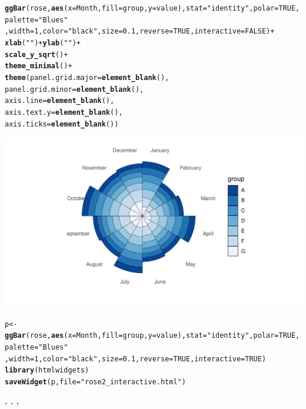 \documentclass{article}\usepackage[]{graphicx}\usepackage[]{color}
\makeatletter
\def\maxwidth{ %
  \ifdim\Gin@nat@width>\linewidth
    \linewidth
  \else
    \Gin@nat@width
  \fi
}
\newcommand{\hlnum}[1]{\textcolor[rgb]{0.686,0.059,0.569}{#1}}%
\newcommand{\hlstr}[1]{\textcolor[rgb]{0.192,0.494,0.8}{#1}}%
\newcommand{\hlopt}[1]{\textcolor[rgb]{0,0,0}{#1}}%
\newcommand{\hlstd}[1]{\textcolor[rgb]{0.345,0.345,0.345}{#1}}%
\newcommand{\hlkwb}[1]{\textcolor[rgb]{0.69,0.353,0.396}{#1}}%
\newcommand{\hlkwc}[1]{\textcolor[rgb]{0.333,0.667,0.333}{#1}}%
\newcommand{\hlkwd}[1]{\textcolor[rgb]{0.737,0.353,0.396}{\textbf{#1}}}%
\newenvironment{kframe}{%
 \def\at@end@of@kframe{}%
 \ifinner\ifhmode%
  \def\at@end@of@kframe{\end{minipage}}%
  \begin{minipage}{\columnwidth}%
 \fi\fi%
 \def\FrameCommand##1{\hskip\@totalleftmargin \hskip-\fboxsep
 \colorbox{shadecolor}{##1}\hskip-\fboxsep
     \hskip-\linewidth \hskip-\@totalleftmargin \hskip\columnwidth}%
 \MakeFramed {\advance\hsize-\width
   \@totalleftmargin\z@ \linewidth\hsize
   \@setminipage}}%
 {\par\unskip\endMakeFramed%
 \at@end@of@kframe}
\newenvironment{knitrout}{}{} %
\makeatother
\begin{document}
\begin{knitrout}
\color{fgcolor}\begin{kframe}
\begin{alltt}
\hlkwd{ggBar}\hlstd{(rose,}\hlkwd{aes}\hlstd{(}\hlkwc{x}\hlstd{=Month,}\hlkwc{fill}\hlstd{=group,}\hlkwc{y}\hlstd{=value),}\hlkwc{stat}\hlstd{=}\hlstr{"identity"}\hlstd{,}\hlkwc{polar}\hlstd{=}\hlnum{TRUE}\hlstd{,}\hlkwc{palette}\hlstd{=}\hlstr{"Blues"}
      \hlstd{,}\hlkwc{width}\hlstd{=}\hlnum{1}\hlstd{,} \hlkwc{color}\hlstd{=}\hlstr{"black"}\hlstd{,}\hlkwc{size}\hlstd{=}\hlnum{0.1}\hlstd{,}\hlkwc{reverse}\hlstd{=}\hlnum{TRUE}\hlstd{,}\hlkwc{interactive}\hlstd{=}\hlnum{FALSE}\hlstd{)}\hlopt{+}
    \hlkwd{xlab}\hlstd{(}\hlstr{""}\hlstd{)} \hlopt{+}  \hlkwd{ylab}\hlstd{(}\hlstr{""}\hlstd{)} \hlopt{+}
    \hlkwd{scale_y_sqrt}\hlstd{()} \hlopt{+}
    \hlkwd{theme_minimal}\hlstd{()} \hlopt{+}
    \hlkwd{theme}\hlstd{(}\hlkwc{panel.grid.major} \hlstd{=} \hlkwd{element_blank}\hlstd{(),}
          \hlkwc{panel.grid.minor} \hlstd{=} \hlkwd{element_blank}\hlstd{(),}
          \hlkwc{axis.line} \hlstd{=} \hlkwd{element_blank}\hlstd{(),}
          \hlkwc{axis.text.y} \hlstd{=} \hlkwd{element_blank}\hlstd{(),}
          \hlkwc{axis.ticks} \hlstd{=} \hlkwd{element_blank}\hlstd{())}
\end{alltt}
\end{kframe}

{\centering \includegraphics[width=\maxwidth]{figure/plot_bar_rose-1} 

}


\begin{kframe}\begin{alltt}
\hlstd{p} \hlkwb{<-} \hlkwd{ggBar}\hlstd{(rose,}\hlkwd{aes}\hlstd{(}\hlkwc{x}\hlstd{=Month,}\hlkwc{fill}\hlstd{=group,}\hlkwc{y}\hlstd{=value),}\hlkwc{stat}\hlstd{=}\hlstr{"identity"}\hlstd{,}\hlkwc{polar}\hlstd{=}\hlnum{TRUE}\hlstd{,}\hlkwc{palette}\hlstd{=}\hlstr{"Blues"}
      \hlstd{,}\hlkwc{width}\hlstd{=}\hlnum{1}\hlstd{,} \hlkwc{color}\hlstd{=}\hlstr{"black"}\hlstd{,}\hlkwc{size}\hlstd{=}\hlnum{0.1}\hlstd{,}\hlkwc{reverse}\hlstd{=}\hlnum{TRUE}\hlstd{,}\hlkwc{interactive}\hlstd{=}\hlnum{TRUE}\hlstd{)}
\hlkwd{library}\hlstd{(htmlwidgets)}
\hlkwd{saveWidget}\hlstd{(p,} \hlkwc{file} \hlstd{=} \hlstr{"rose2_interactive.html"}\hlstd{)}
\end{alltt}
\end{kframe}
\end{knitrout}
\begin{center}
\textbf{. . .}
\end{center}
\end{document}

